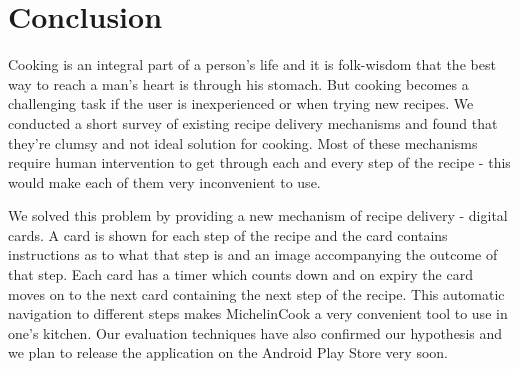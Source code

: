 \section{Conclusion}

Cooking is an integral part of a person's life and it is folk-wisdom that the best way to reach a man's heart is through his stomach. But cooking becomes a challenging task if the user is inexperienced or when trying new recipes. We conducted a short survey of existing recipe delivery mechanisms and found that they're clumsy and not ideal solution for cooking. Most of these mechanisms require human intervention to get through each and every step of the recipe - this would make each of them very inconvenient to use. 

We solved this problem by providing a new mechanism of recipe delivery - digital cards. A card is shown for each step of the recipe and the card contains instructions as to what that step is and an image accompanying the outcome of that step. Each card has a timer which counts down and on expiry the card moves on to the next card containing the next step of the recipe. This automatic navigation to different steps makes MichelinCook a very convenient tool to use in one's kitchen. Our evaluation techniques have also confirmed our hypothesis and we plan to release the application on the Android Play Store very soon.